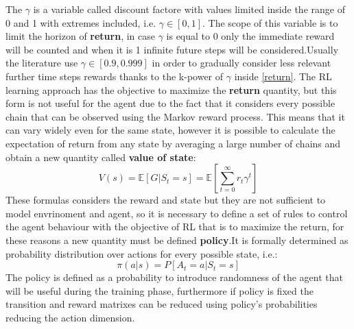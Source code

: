 The $\gamma$ is a variable called discount factore with values limited inside the range of 0 and 1 with extremes included, i.e. $\gamma \in [0,1]$. The scope of this variable is to limit the horizon of \textbf{return}, in case $\gamma$ is equal to 0 only the immediate reward will be counted and when it is 1 infinite future steps will be considered.Usually the literature use $\gamma \in [0.9, 0.999]$ in order to gradually consider less relevant further time steps rewards thanks to the k-power of $\gamma$ inside \ref{return}.
The RL learning approach has the objective to maximize the \textbf{return} quantity, but this form is not useful for the agent due to the fact that it considers every possible chain that can be observed using the Markov reward process. This means that it can vary widely even for the same state, however it is possible to calculate the expectation of return from any state by averaging a large number of chains and obtain a new quantity called \textbf{value of state}:
\begin{equation}
	V(s) = \mathbb{E}[G | S_t = s] = \mathbb{E}[\sum_{t=0}^{\infty} r_t \gamma^t]
\end{equation}
These formulas considers the reward and state but they are not sufficient to model envrinoment and agent, so it is necessary to define a set of rules to control the agent behaviour with the objective of RL that is to maximize the return, for these reasons a new quantity must be defined \textbf{policy}.It is formally determined as probability distribution over actions for every possible state, i.e.:
\begin{equation}\label{policy}
	\pi(a|s) = P[A_t = a | S_t = s]
\end{equation}
The policy is defined as a probability to introduce randomness of the agent that will be useful during the training phase, furthermore if policy is fixed the transition and reward matrixes can be reduced using policy's probabilities reducing the action dimension.
